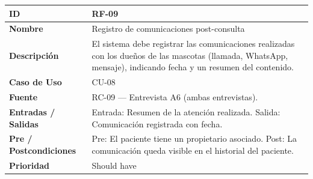 \documentclass[
]{article}
\newcounter{none} %
\begin{document}
{\def\LTcaptype{none} %
\begin{longtable}[]{|
  >{\raggedright\arraybackslash}p{}|
  >{\raggedright\arraybackslash}p{}|}
\hline
\begin{minipage}[b]{\linewidth}\raggedright
\textbf{ID}
\end{minipage} & \begin{minipage}[b]{\linewidth}\raggedright
RF-09
\end{minipage} \\
\hline
\endhead
\hline
\endlastfoot
\textbf{Nombre} & \begin{minipage}[t]{\linewidth}\raggedright
Registro de comunicaciones post-consulta
\end{minipage} \\
\hline
\textbf{Descripción} & \begin{minipage}[t]{\linewidth}\raggedright
El sistema debe registrar las comunicaciones realizadas con los dueños de las mascotas (llamada, WhatsApp, mensaje), indicando fecha y un resumen del contenido.
\end{minipage} \\
\hline
\textbf{Caso de Uso} & \begin{minipage}[t]{\linewidth}\raggedright
CU-08
\end{minipage} \\
\hline
\textbf{Fuente} & \begin{minipage}[t]{\linewidth}\raggedright
RC-09 — Entrevista A6 (ambas entrevistas).
\end{minipage} \\
\hline
\textbf{Entradas / Salidas} & \begin{minipage}[t]{\linewidth}\raggedright
Entrada: Resumen de la atención realizada. Salida: Comunicación registrada con fecha.
\end{minipage} \\
\hline
\textbf{Pre / Postcondiciones} & \begin{minipage}[t]{\linewidth}\raggedright
Pre: El paciente tiene un propietario asociado. Post: La comunicación queda visible en el historial del paciente.
\end{minipage} \\
\hline
\textbf{Prioridad} & \begin{minipage}[t]{\linewidth}\raggedright
Should have
\end{minipage} \\
\hline

\end{longtable}}
\end{document}
